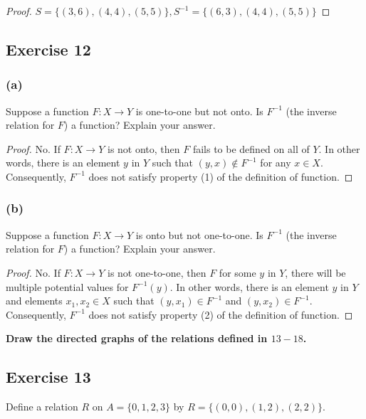 \documentclass[14pt]{extarticle}
\newcommand{\cy}{\color{cyan}}
\begin{document}
\begin{proof}
\(S = \{(3, 6), (4, 4), (5, 5)\}, S^{-1} = \{(6, 3), (4, 4), (5, 5)\}\)
\end{proof}

\subsection{Exercise 12}

\subsubsection{(a)}
Suppose a function \(F: X \to Y\) is one-to-one but not onto. Is \(F^{-1}\) (the inverse relation for $F$) a 
function? Explain your answer.

\begin{proof}
No. If \(F: X \to Y\) is not onto, then $F$ fails to be defined on all of $Y$. In other words, there is an element 
$y$ in $Y$ such that \((y, x) \notin F^{-1}\) for any \(x \in X\). Consequently, \(F^{-1}\) does not satisfy property 
(1) of the definition of function.
\end{proof}

\subsubsection{(b)}
Suppose a function \(F: X \to Y\) is onto but not one-to-one. Is \(F^{-1}\) (the inverse relation for $F$) a 
function? Explain your answer.

\begin{proof}
No. If \(F: X \to Y\) is not one-to-one, then $F$ for some $y$ in $Y$, there will be multiple potential values for 
\(F^{-1}(y)\). In other words, there is an element $y$ in $Y$ and elements \(x_1, x_2 \in X\) such that \((y, x_1) 
\in F^{-1}\) and \((y, x_2) \in F^{-1}\). Consequently, \(F^{-1}\) does not satisfy property (2) of the definition 
of function.
\end{proof}

{\bf \cy Draw the directed graphs of the relations defined in $13-18$.}

\subsection{Exercise 13}
Define a relation $R$ on \(A = \{0, 1, 2, 3\}\) by \(R = \{(0, 0), (1, 2), (2, 2)\}\).
\end{document}
